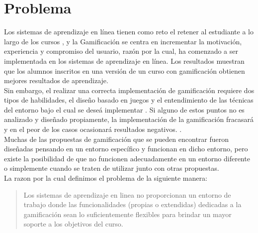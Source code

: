 
\clearpage

\section{Problema}
\label{sec:problematica}

Los sistemas de aprendizaje en línea tienen como reto el retener al estudiante a lo largo de los cursos \cite{DropOut}, y la Gamificación se centra en incrementar la motivación, experiencia y compromiso del usuario, razón por la cual, ha comenzado a ser implementada en los sistemas de aprendizaje en línea. Los resultados muestran que los alumnos inscritos en una versión de un curso con gamificación obtienen mejores resultados de aprendizaje. \cite{GamInE-Learning}\\

\noindent Sin embargo, el realizar una correcta implementación de gamificación requiere dos tipos de habilidades, el diseño basado en juegos y el entendimiento de las técnicas del entorno bajo el cual se deseá implementar \cite[p. 7]{FrameWorkForTheWin}. Si alguno de estos puntos no es analizado y diseñado propiamente, la implementación de la gamificación fracasará y en el peor de los casos ocasionará resultados negativos. \cite{Wood-Reiners}.\\

\noindent Muchas de las propuestas de gamificación que se pueden encontrar fueron diseñadas pensando en un entorno específico y funcionan en dicho entorno, pero existe la posibilidad de que no funcionen adecuadamente en un entorno diferente o simplemente cuando se traten de utilizar junto con otras propuestas.\\

    \noindent La razon por la cual definimos el problema de la siguiente manera:

    \begin{quote}
    \colorbox{blue!05}{\parbox{\dimexpr\linewidth-2\fboxsep}{\strut%
        Los sistemas de aprendizaje en linea no proporcionan un entorno
        de trabajo donde las funcionalidades (propias o extendidas) dedicadas
        a la gamificación sean lo suficientemente flexibles para brindar un
        mayor soporte a los objetivos del curso.
    \strut}}%
    \end{quote}
    

